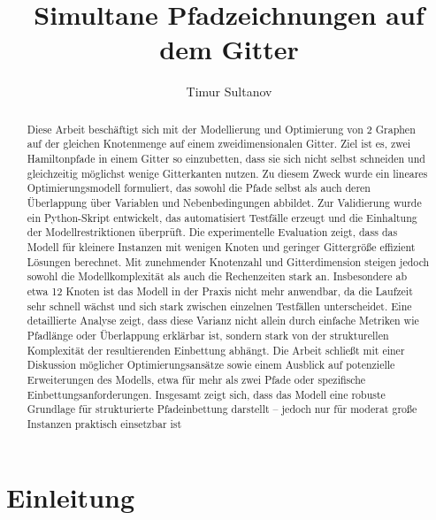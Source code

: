 \documentclass[bachelor, german]{algothesis}
\title{Simultane Pfadzeichnungen auf dem Gitter} %
\author{Timur Sultanov} %
\begin{document}
\begin{abstract}
Diese Arbeit beschäftigt sich mit der Modellierung und Optimierung von 2 Graphen auf der gleichen Knotenmenge auf einem zweidimensionalen Gitter. Ziel ist es, zwei Hamiltonpfade in einem Gitter so einzubetten, dass sie sich nicht selbst schneiden und gleichzeitig möglichst wenige Gitterkanten nutzen. Zu diesem Zweck wurde ein lineares Optimierungsmodell formuliert, das sowohl die Pfade selbst als auch deren Überlappung über Variablen und Nebenbedingungen abbildet. Zur Validierung wurde ein Python-Skript entwickelt, das automatisiert Testfälle erzeugt und die Einhaltung der Modellrestriktionen überprüft.\newline 
Die experimentelle Evaluation zeigt, dass das Modell für kleinere Instanzen mit wenigen Knoten und geringer Gittergröße effizient Lösungen berechnet. Mit zunehmender Knotenzahl und Gitterdimension steigen jedoch sowohl die Modellkomplexität als auch die Rechenzeiten stark an. Insbesondere ab etwa 12 Knoten ist das Modell in der Praxis nicht mehr anwendbar, da die Laufzeit sehr schnell wächst und sich stark zwischen einzelnen Testfällen unterscheidet. Eine detaillierte Analyse zeigt, dass diese Varianz nicht allein durch einfache Metriken wie Pfadlänge oder Überlappung erklärbar ist, sondern stark von der strukturellen Komplexität der resultierenden Einbettung abhängt.\newline 
Die Arbeit schließt mit einer Diskussion möglicher Optimierungsansätze sowie einem Ausblick auf potenzielle Erweiterungen des Modells, etwa für mehr als zwei Pfade oder spezifische Einbettungsanforderungen. Insgesamt zeigt sich, dass das Modell eine robuste Grundlage für strukturierte Pfadeinbettung darstellt – jedoch nur für moderat große Instanzen praktisch einsetzbar ist
\end{abstract}

\thesistableofcontents

\chapter{Einleitung}
\end{document}
